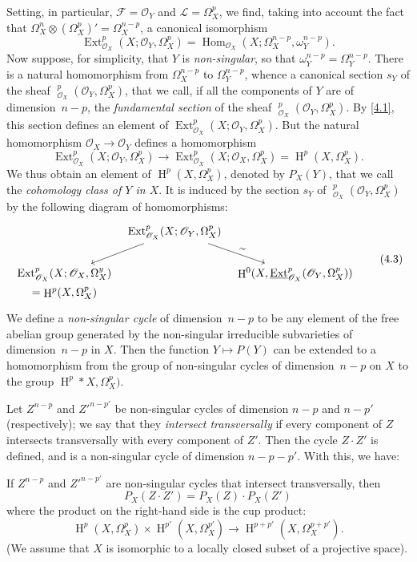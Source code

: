 \documentclass{article}
\theoremstyle{plain}
\newenvironment{theorem}[1]
  {\renewcommand\theinnercustomtheorem{#1}\innercustomtheorem}
  {\endinnercustomtheorem}
\theoremstyle{definition}
\newcommand{\sh}[1]{{\mathscr{#1}}}
\DeclareMathOperator{\Ext}{Ext}
\DeclareMathOperator{\Hom}{Hom}
\DeclareMathOperator{\shExt}{\underline{Ext}}
\DeclareMathOperator{\HH}{H}
\newcommand{\oldpage}[1]{\marginpar{\footnotesize$\Big\vert$ \textit{p.~#1}}}
\begin{document}
Setting, in particular, $\sh{F}=\sh{O}_Y$ and $\sh{L}=\Omega_X^p$, we find, taking into account the fact that $\Omega_X^n\otimes(\Omega_X^p)'=\Omega_X^{n-p}$, a canonical isomorphism
\[
\label{4.2}
  \Ext_{\sh{O}_X}^p(X;\sh{O}_Y,\Omega_X^p) = \Hom_{\sh{O}_X}(X;\Omega_X^{n-p},\omega_Y^{n-p}).
\tag{4.2}
\]
Now suppose, for simplicity, that $Y$ is \emph{non-singular}, so that $\omega_Y^{n-p}=\Omega_Y^{n-p}$.
There is a natural homomorphism from $\Omega_X^{n-p}$ to $\Omega_Y^{n-p}$, whence a canonical section $s_Y$ of the sheaf $\shExt_{\sh{O}_X}^p(\sh{O}_Y,\Omega_X^p)$, that we call, if all the components of $Y$ are of dimension~$n-p$, the \emph{fundamental section} of the sheaf $\shExt_{\sh{O}_X}^p(\sh{O}_Y,\Omega_X^p)$.
By \cref{4.1}, this section defines an element of $\Ext_{\sh{O}_X}^p(X;\sh{O}_Y,\Omega_X^p)$.
But the natural homomorphism $\sh{O}_X\to\sh{O}_Y$ defines a homomorphism
\[
  \Ext_{\sh{O}_X}^p(X;\sh{O}_Y,\Omega_X^p) \to \Ext_{\sh{O}_X}^p(X;\sh{O}_X,\Omega_X^p) = \HH^p(X,\Omega_X^p).
\]
We thus obtain an element of $\HH^p(X,\Omega_X^p)$, denoted by $P_X(Y)$, that we call the \emph{cohomology class of $Y$ in $X$}.
It is induced by the section $s_Y$ of $\shExt_{\sh{O}_X}^p(\sh{O}_Y,\Omega_X^p)$ by the following diagram of homomorphisms:
\[
\label{4.3}
  \begin{tikzcd}[column sep=tiny]
    & \Ext_{\sh{O}_X}^p(X;\sh{O}_Y,\Omega_X^p) \ar[dl] \ar[dr,"\sim"]
  \\\Ext_{\sh{O}_X}^p(X;\sh{O}_X,\Omega_X^y) && \HH^0(X,\shExt_{\sh{O}_X}^p(\sh{O}_Y,\Omega_X^p))
  \\[-2em]=\HH^p(X,\Omega_X^p)
  \end{tikzcd}
\tag{4.3}
\]
We define a \emph{non-singular cycle} of dimension~$n-p$ to be any element of the free abelian group generated by the non-singular irreducible subvarieties of dimension~$n-p$ in $X$.
Then the function $Y\mapsto P(Y)$ can be extended to a homomorphism from the group of non-singular cycles of dimension~$n-p$ on $X$ to the group $\HH^p*X,\Omega_X^p)$.

Let $Z^{n-p}$ and $Z'^{n-p'}$ be non-singular cycles of dimension $n-p$ and $n-p'$ (respectively);
we say that they \emph{intersect transversally} if every component of $Z$ intersects transversally with every component of $Z'$.
Then the cycle $Z\cdot Z'$ is defined, and is a non-singular cycle of dimension $n-p-p'$.
With this, we have:

\oldpage{149-11}
\begin{theorem}{1}
\label{theorem1}
  If $Z^{n-p}$ and $Z'^{n-p'}$ are non-singular cycles that intersect transversally, then
  \[
  \label{4.4}
    P_X(Z\cdot Z') = P_X(Z)\cdot P_X(Z')
  \tag{4.4}
  \]
  where the product on the right-hand side is the cup product:
  \[
    \HH^p(X,\Omega_X^p)\times\HH^{p'}(X,\Omega_X^{p'}) \to \HH^{p+p'}(X,\Omega_X^{p+p'}).
  \]
  (We assume that $X$ is isomorphic to a locally closed subset of a projective space).
\end{theorem}
\end{document}
